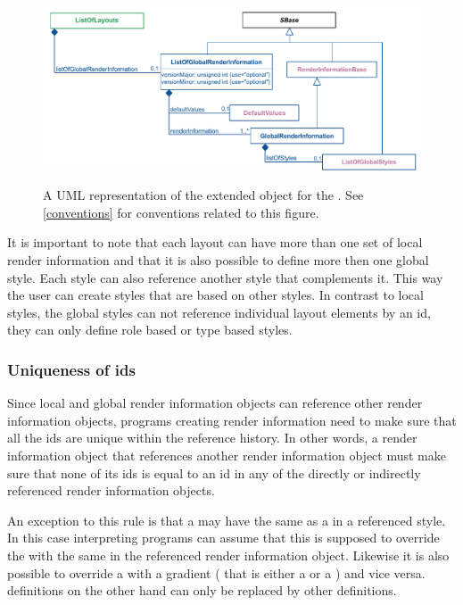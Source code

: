\begin{figure}[!h]
  \centering
  \includegraphics[width=\textwidth]{images/render-listoflayout-uml}\\
  \caption{A UML representation of the extended \ListOfLayouts object for the \RenderPackage.  See \ref{conventions} for conventions related to this figure. }
  \label{fig:lol_render_uml}
\end{figure}

It is important to note that each layout can have more than one 
set of local render information and that it is 
also possible to define more then one global style. Each style can also 
reference another style that complements it. This way the user can create 
styles that are based on other styles. In contrast to local styles, the global styles can not 
reference individual layout elements by an id, they can only define role based or 
type based styles.

\subsubsection{Uniqueness of ids}
\label{unique-id}

Since local and global render information objects can reference other render information objects, programs creating
render information need to make sure that all the ids are unique within the reference history. In other words, a 
render information object that references another render information object must make sure that none of its ids is equal
to an id in any of the directly or indirectly referenced render information objects. 

An exception to this rule is that a \ColorDefinition may have the same  as a \ColorDefinition in a referenced style. In this case interpreting programs can assume that this \ColorDefinition is supposed to override the \ColorDefinition with the
same  in the referenced render information object. Likewise it is also possible to override a \ColorDefinition with a  gradient ( that is either a \LinearGradient or a \RadialGradient) and vice versa. \LineEnding definitions on the other hand can only be replaced by other \LineEnding definitions.

